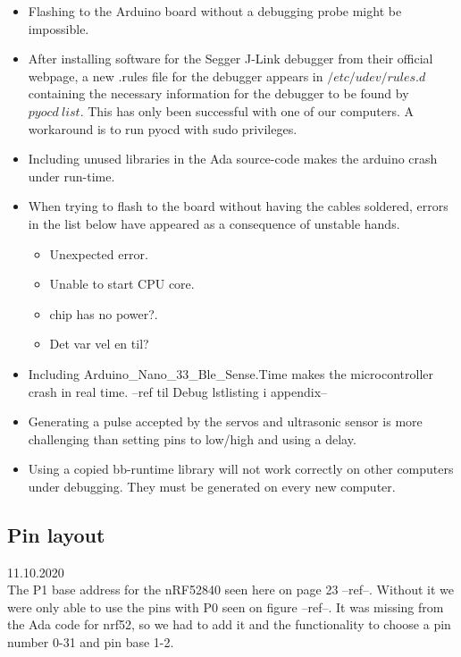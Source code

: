 \documentclass{article}
\begin{document}
\begin{itemize}
	\item Flashing to the Arduino board without a debugging probe might be impossible.

	\item After installing software for the Segger J-Link debugger from their official webpage, a new .rules file for the debugger appears in $/etc/udev/rules.d$ containing the necessary information for the debugger to be found by $pyocd\ list$. This has only been successful with one of our computers. A workaround is to run pyocd with sudo privileges.

	\item Including unused libraries in the Ada source-code makes the arduino crash under run-time.

	\item When trying to flash to the board without having the cables soldered, errors in the list below have appeared as a consequence of unstable hands.
		\begin{itemize}
			\item Unexpected error.
			\item Unable to start CPU core.
			\item chip has no power?.
			\item Det var vel en til?
		\end{itemize}

	\item Including Arduino\_Nano\_33\_Ble\_Sense.Time makes the microcontroller crash in real time. --ref til Debug lstlisting i appendix--

	\item Generating a pulse accepted by the servos and ultrasonic sensor is more challenging than setting pins to low/high and using a delay.

	\item Using a copied bb-runtime library will not work correctly on other computers under debugging. They must be generated on every new computer.

\end{itemize}

\subsection{Pin layout}
11.10.2020\\
The P1 base address for the nRF52840 seen here on page 23 --ref--. Without it we were only able to use the pins with P0 seen on figure --ref--. It was missing from the Ada code for nrf52, so we had to add it and the functionality to choose a pin number 0-31 and pin base 1-2.
\end{document}
